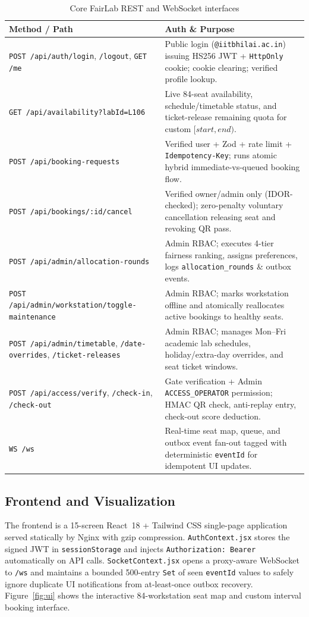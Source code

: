 \documentclass[manuscript,screen,review]{acmart}
\begin{document}
\begin{table}[htbp]
  \caption{Core FairLab REST and WebSocket interfaces}
  \label{tab:interfaces}
  \small
  \begin{tabularx}{\columnwidth}{@{}p{}L@{}}
    \toprule
    \textbf{Method / Path} & \textbf{Auth \& Purpose} \\
    \midrule
    \texttt{POST /api/auth/login}, \texttt{/logout}, \texttt{GET /me} & Public login (\texttt{@iitbhilai.ac.in}) issuing HS256 JWT + \texttt{HttpOnly} cookie; cookie clearing; verified profile lookup. \\
    \texttt{GET /api/availability?labId=L106} & Live 84-seat availability, schedule/timetable status, and ticket-release remaining quota for custom $[start, end)$. \\
    \texttt{POST /api/booking-requests} & Verified user + Zod + rate limit + \texttt{Idempotency-Key}; runs atomic hybrid immediate-vs-queued booking flow. \\
    \texttt{POST /api/bookings/:id/cancel} & Verified owner/admin only (IDOR-checked); zero-penalty voluntary cancellation releasing seat and revoking QR pass. \\
    \texttt{POST /api/admin/allocation-rounds} & Admin RBAC; executes 4-tier fairness ranking, assigns preferences, logs \texttt{allocation\_rounds} \& outbox events. \\
    \texttt{POST /api/admin/workstation/toggle-maintenance} & Admin RBAC; marks workstation offline and atomically reallocates active bookings to healthy seats. \\
    \texttt{POST /api/admin/timetable}, \texttt{/date-overrides}, \texttt{/ticket-releases} & Admin RBAC; manages Mon--Fri academic lab schedules, holiday/extra-day overrides, and seat ticket windows. \\
    \texttt{POST /api/access/verify}, \texttt{/check-in}, \texttt{/check-out} & Gate verification + Admin \texttt{ACCESS\_OPERATOR} permission; HMAC QR check, anti-replay entry, check-out score deduction. \\
    \texttt{WS /ws} & Real-time seat map, queue, and outbox event fan-out tagged with deterministic \texttt{eventId} for idempotent UI updates. \\
    \bottomrule
  \end{tabularx}
\end{table}

\subsection{Frontend and Visualization}
The frontend is a 15-screen React~18 + Tailwind CSS single-page application served statically by Nginx with gzip compression. \texttt{AuthContext.jsx} stores the signed JWT in \texttt{sessionStorage} and injects \texttt{Authorization: Bearer} automatically on API calls. \texttt{SocketContext.jsx} opens a proxy-aware WebSocket to \texttt{/ws} and maintains a bounded 500-entry \texttt{Set} of seen \texttt{eventId} values to safely ignore duplicate UI notifications from at-least-once outbox recovery. Figure~\ref{fig:ui} shows the interactive 84-workstation seat map and custom interval booking interface.
\end{document}
